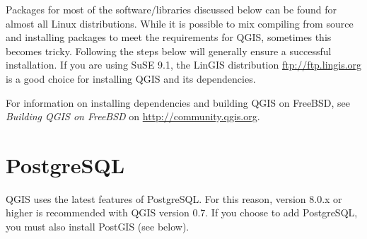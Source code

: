 Packages for most of the software/libraries discussed below can be found for almost all Linux distributions. While it is possible to mix compiling from source and installing packages to meet the requirements for QGIS, sometimes this becomes tricky. Following the steps below will generally ensure a successful installation. If you are using SuSE 9.1, the LinGIS distribution \url{ftp://ftp.lingis.org} is a good choice for installing QGIS and its dependencies.

For information on installing dependencies and building QGIS on FreeBSD, see
\textit{Building QGIS on FreeBSD} on \url{http://community.qgis.org}.

  \section{PostgreSQL}
  QGIS uses the latest features of PostgreSQL. For this reason, version 8.0.x or higher is recommended with QGIS version 0.7. If you choose to add PostgreSQL, you must also install PostGIS (see below). 
